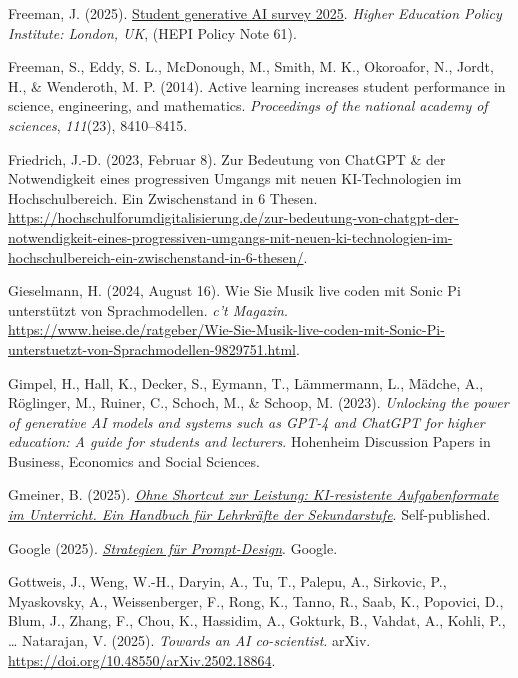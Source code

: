 \documentclass[
  ngerman,
  letterpaper,
  DIV=11]{scrreprt}
\newlength{\cslhangindent}
\newenvironment{CSLReferences}[2] %
 {\begin{list}{}{%
  \setlength{\itemindent}{0pt}
  \setlength{\leftmargin}{0pt}
  \setlength{\parsep}{0pt}
  \ifodd #1
   \setlength{\leftmargin}{\cslhangindent}
   \setlength{\itemindent}{-1\cslhangindent}
  \fi
  \setlength{\itemsep}{#2\baselineskip}}}
 {\end{list}}
\begin{document}
\begin{CSLReferences}{1}{0}
Freeman, J. (2025).
\href{https://www.hepi.ac.uk/reports/student-generative-ai-survey-2025/}{Student
generative AI survey 2025}. \emph{Higher Education Policy Institute:
London, UK}, (HEPI Policy Note 61).

Freeman, S., Eddy, S. L., McDonough, M., Smith, M. K., Okoroafor, N.,
Jordt, H., \& Wenderoth, M. P. (2014). Active learning increases student
performance in science, engineering, and mathematics. \emph{Proceedings
of the national academy of sciences}, \emph{111}(23), 8410--8415.

Friedrich, J.-D. (2023, Februar 8). Zur Bedeutung von ChatGPT \& der
Notwendigkeit eines progressiven Umgangs mit neuen KI-Technologien im
Hochschulbereich. Ein Zwischenstand in 6 Thesen.
\url{https://hochschulforumdigitalisierung.de/zur-bedeutung-von-chatgpt-der-notwendigkeit-eines-progressiven-umgangs-mit-neuen-ki-technologien-im-hochschulbereich-ein-zwischenstand-in-6-thesen/}.

Gieselmann, H. (2024, August 16). Wie Sie Musik live coden mit Sonic Pi
unterstützt von Sprachmodellen. \emph{c't Magazin}.
\url{https://www.heise.de/ratgeber/Wie-Sie-Musik-live-coden-mit-Sonic-Pi-unterstuetzt-von-Sprachmodellen-9829751.html}.

Gimpel, H., Hall, K., Decker, S., Eymann, T., Lämmermann, L., Mädche,
A., Röglinger, M., Ruiner, C., Schoch, M., \& Schoop, M. (2023).
\emph{Unlocking the power of generative AI models and systems such as
GPT-4 and ChatGPT for higher education: A guide for students and
lecturers}. Hohenheim Discussion Papers in Business, Economics and
Social Sciences.

Gmeiner, B. (2025). \emph{\href{https://www.bernhardgmeiner.com}{Ohne
Shortcut zur Leistung: KI-resistente Aufgabenformate im Unterricht. Ein
Handbuch für Lehrkräfte der Sekundarstufe}}. Self-published.

Google (2025).
\emph{\href{https://ai.google.dev/gemini-api/docs/prompting-strategies?hl=de}{Strategien
für Prompt-Design}}. Google.

Gottweis, J., Weng, W.-H., Daryin, A., Tu, T., Palepu, A., Sirkovic, P.,
Myaskovsky, A., Weissenberger, F., Rong, K., Tanno, R., Saab, K.,
Popovici, D., Blum, J., Zhang, F., Chou, K., Hassidim, A., Gokturk, B.,
Vahdat, A., Kohli, P., \ldots{} Natarajan, V. (2025). \emph{Towards an
AI co-scientist}. arXiv.
\url{https://doi.org/10.48550/arXiv.2502.18864}.


\end{CSLReferences}
\end{document}
